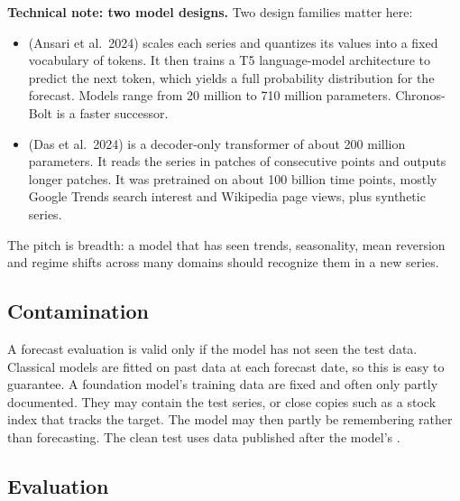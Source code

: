 \begin{technote}
\textbf{Technical note: two model designs.} Two design families matter here:

\begin{itemize}
  \item {} (Ansari et al.\ 2024) scales each series and quantizes its values into a fixed vocabulary of tokens. It then trains a T5 language-model architecture to predict the next token, which yields a full probability distribution for the forecast. Models range from 20 million to 710 million parameters. Chronos-Bolt is a faster successor.
  \item {} (Das et al.\ 2024) is a decoder-only transformer of about 200 million parameters. It reads the series in patches of consecutive points and outputs longer patches. It was pretrained on about 100 billion time points, mostly Google Trends search interest and Wikipedia page views, plus synthetic series.
\end{itemize}
\end{technote}

The pitch is breadth: a model that has seen trends, seasonality, mean reversion and regime shifts across many domains should recognize them in a new series.

\subsection{Contamination}
\label{sec:21-contam}

A forecast evaluation is valid only if the model has not seen the test data. Classical models are fitted on past data at each forecast date, so this is easy to guarantee. A foundation model's training data are fixed and often only partly documented. They may contain the test series, or close copies such as a stock index that tracks the target. The model may then partly be remembering rather than forecasting. The clean test uses data published after the model's .

\subsection{Evaluation}

